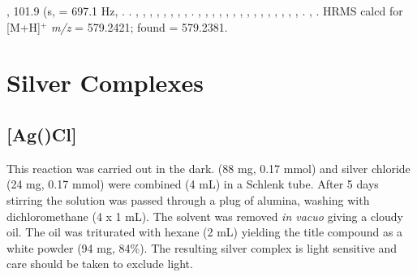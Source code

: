 \begin{sloppypar}
,
101.9 (s, \JPSe{} = 697.1 Hz, .
.
,
,
,
,
,
,
,
,
.
,
,
,
,
,
,
,
,
,
,
,
,
,
,
,
.
,
.
HRMS calcd for  [M+H]$^+$ \emph{m/z} = 579.2421; found = 579.2381.
\end{sloppypar}

\section{Silver Complexes}
\label{section:experimental:silver}



\subsection*{[Ag(\tButhixantphos)Cl]}


This reaction was carried out in the dark.  \tBuThixantphos{} (88 mg, 0.17 mmol) and silver chloride (24 mg, 0.17 mmol) were combined  (4 mL) in a Schlenk tube.  After 5 days stirring the solution was passed through a plug of alumina, washing with dichloromethane (4 x 1 mL).  The solvent was removed \emph{in vacuo} giving a cloudy oil.  The oil was triturated with hexane (2 mL) yielding the title compound as a white powder (94 mg, 84\%).  The resulting silver complex is light sensitive and care should be taken to exclude light.

